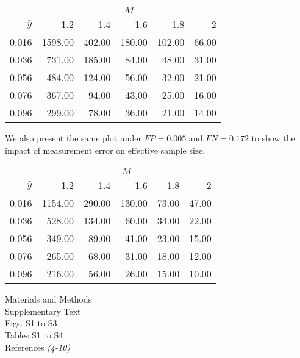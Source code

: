 \documentclass[12pt]{article}
\begin{document}
\begin{table}[ht]
\centering
\begin{tabular}{rrrrrr}
& \multicolumn{5}{c}{$M$} \\ \cline{2-6}
$\bar y$ & 1.2 & 1.4 & 1.6 & 1.8 & 2 \\
  \hline
0.016 & 1598.00 & 402.00 & 180.00 & 102.00 & 66.00 \\
  0.036 & 731.00 & 185.00 & 84.00 & 48.00 & 31.00 \\
  0.056 & 484.00 & 124.00 & 56.00 & 32.00 & 21.00 \\
  0.076 & 367.00 & 94.00 & 43.00 & 25.00 & 16.00 \\
  0.096 & 299.00 & 78.00 & 36.00 & 21.00 & 14.00 \\
   \hline
\end{tabular}
\end{table}


We also present the same plot under $FP = 0.005$ and $FN = 0.172$ to show the impact of measurement error on effective sample size.

\begin{table}[ht]
\centering
\begin{tabular}{rrrrrr}
  & \multicolumn{5}{c}{$M$} \\ \cline{2-6}
$\bar y$ & 1.2 & 1.4 & 1.6 & 1.8 & 2 \\
  \hline
0.016 & 1154.00 & 290.00 & 130.00 & 73.00 & 47.00 \\
  0.036 & 528.00 & 134.00 & 60.00 & 34.00 & 22.00 \\
  0.056 & 349.00 & 89.00 & 41.00 & 23.00 & 15.00 \\
  0.076 & 265.00 & 68.00 & 31.00 & 18.00 & 12.00 \\
  0.096 & 216.00 & 56.00 & 26.00 & 15.00 & 10.00 \\
   \hline
\end{tabular}
\end{table}




Materials and Methods\\
Supplementary Text\\

Figs. S1 to S3\\
Tables S1 to S4\\
References \textit{(4-10)}


\end{document}
